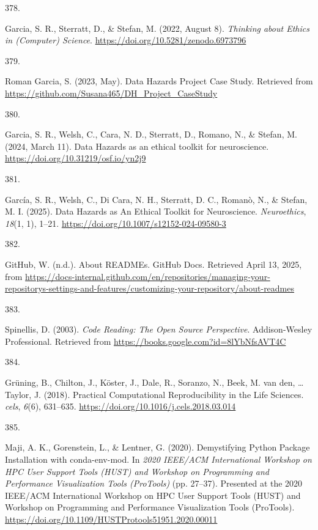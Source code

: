 \documentclass[
  11pt,
  letterpaper,
]{scrreprt}
\newlength{\cslhangindent}
\newlength{\csllabelwidth}
\newenvironment{CSLReferences}[2] %
 {\begin{list}{}{%
  \setlength{\itemindent}{0pt}
  \setlength{\leftmargin}{0pt}
  \setlength{\parsep}{0pt}
  \ifodd #1
   \setlength{\leftmargin}{\cslhangindent}
   \setlength{\itemindent}{-1\cslhangindent}
  \fi
  \setlength{\itemsep}{#2\baselineskip}}}
 {\end{list}}
\newcommand{\CSLLeftMargin}[1]{\parbox[t]{\csllabelwidth}{\strut#1\strut}}
\newcommand{\CSLRightInline}[1]{\parbox[t]{\linewidth - \csllabelwidth}{\strut#1\strut}}
\begin{document}
\begin{CSLReferences}{0}{0}
\CSLLeftMargin{378. }%
\CSLRightInline{Garcia, S. R., Sterratt, D., \& Stefan, M. (2022, August
8). \emph{Thinking about {Ethics} in ({Computer}) {Science}}.
\url{https://doi.org/10.5281/zenodo.6973796}}

\CSLLeftMargin{379. }%
\CSLRightInline{Roman Garcia, S. (2023, May). Data {Hazards Project Case
Study}. Retrieved from
\url{https://github.com/Susana465/DH_Project_CaseStudy}}

\CSLLeftMargin{380. }%
\CSLRightInline{Garcia, S. R., Welsh, C., Cara, N. D., Sterratt, D.,
Romano, N., \& Stefan, M. (2024, March 11). Data {Hazards} as an ethical
toolkit for neuroscience. \url{https://doi.org/10.31219/osf.io/yn2j9}}

\CSLLeftMargin{381. }%
\CSLRightInline{García, S. R., Welsh, C., Di Cara, N. H., Sterratt, D.
C., Romanò, N., \& Stefan, M. I. (2025). Data {Hazards} as {An Ethical
Toolkit} for {Neuroscience}. \emph{Neuroethics}, \emph{18}(1, 1), 1--21.
\url{https://doi.org/10.1007/s12152-024-09580-3}}

\CSLLeftMargin{382. }%
\CSLRightInline{GitHub, W. (n.d.). About {READMEs}. GitHub Docs.
Retrieved April 13, 2025, from
\url{https://docs-internal.github.com/en/repositories/managing-your-repositorys-settings-and-features/customizing-your-repository/about-readmes}}

\CSLLeftMargin{383. }%
\CSLRightInline{Spinellis, D. (2003). \emph{Code {Reading}: {The Open
Source Perspective}}. Addison-Wesley Professional. Retrieved from
\url{https://books.google.com?id=8lYbNfsAVT4C}}

\CSLLeftMargin{384. }%
\CSLRightInline{Grüning, B., Chilton, J., Köster, J., Dale, R., Soranzo,
N., Beek, M. van den, \ldots{} Taylor, J. (2018). Practical
{Computational Reproducibility} in the {Life Sciences}. \emph{cels},
\emph{6}(6), 631--635. \url{https://doi.org/10.1016/j.cels.2018.03.014}}

\CSLLeftMargin{385. }%
\CSLRightInline{Maji, A. K., Gorenstein, L., \& Lentner, G. (2020).
Demystifying {Python Package Installation} with conda-env-mod. In
\emph{2020 {IEEE}/{ACM International Workshop} on {HPC User Support
Tools} ({HUST}) and {Workshop} on {Programming} and {Performance
Visualization Tools} ({ProTools})} (pp. 27--37). Presented at the 2020
{IEEE}/{ACM International Workshop} on {HPC User Support Tools} ({HUST})
and {Workshop} on {Programming} and {Performance Visualization Tools}
({ProTools}).
\url{https://doi.org/10.1109/HUSTProtools51951.2020.00011}}


\end{CSLReferences}
\end{document}
